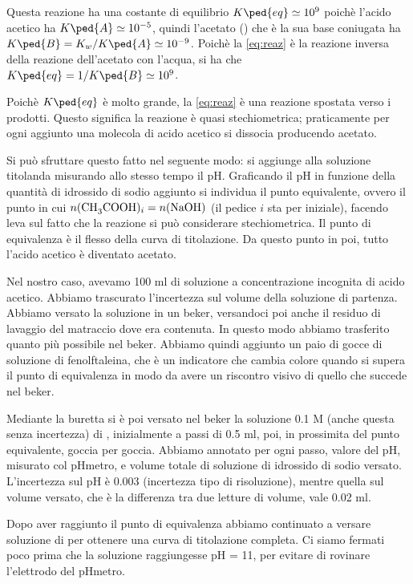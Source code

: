 Questa reazione ha una costante di equilibrio $K\ped{eq} \simeq 10^9$ poichè l'acido acetico ha $K\ped{A} \simeq 10^{-5}$,
quindi l'acetato () che è la sua base coniugata ha $K\ped{B} = K_w / K\ped{A} \simeq 10^{-9}$.
Poichè la \eqref{eq:reaz} è la reazione
inversa della reazione dell'acetato con l'acqua, si ha che $K\ped{eq} = 1/K\ped{B} \simeq 10^9$.

Poichè $K\ped{eq}$ è molto grande, la \eqref{eq:reaz} è una reazione spostata verso i prodotti. Questo significa la reazione
è quasi stechiometrica; praticamente per ogni  aggiunto una molecola di acido acetico si dissocia producendo acetato.

Si può sfruttare questo fatto nel seguente modo: si aggiunge  alla soluzione titolanda misurando allo
stesso tempo il pH. Graficando il pH in funzione della quantità di idrossido di sodio aggiunto si individua
il punto equivalente, ovvero il punto in cui $n(\ce{CH3COOH})_i = n(\ce{NaOH})$ (il pedice $i$ sta per iniziale),
facendo leva sul fatto che la reazione si può considerare stechiometrica. Il punto di equivalenza è
il flesso della curva di titolazione. Da questo punto in poi, tutto l'acido acetico è diventato acetato.

Nel nostro caso, avevamo 100 ml di soluzione a concentrazione incognita di acido acetico. Abbiamo
trascurato l'incertezza sul volume della soluzione di partenza. Abbiamo versato la soluzione in un
beker, versandoci poi anche il residuo di lavaggio del matraccio dove era contenuta. In questo modo abbiamo
trasferito quanto più  possibile nel beker. Abbiamo quindi aggiunto un paio di gocce
di soluzione di fenolftaleina, che è un indicatore che cambia colore quando si supera il punto di equivalenza
in modo da avere un riscontro visivo di quello che succede nel beker.

Mediante la buretta si è poi versato nel beker la soluzione 0.1 M (anche questa senza incertezza) di , inizialmente a
passi di 0.5 ml, poi, in prossimita del punto equivalente, goccia per goccia. Abbiamo annotato per ogni passo, valore
del pH, misurato col pHmetro, e volume totale di soluzione di idrossido di sodio versato. L'incertezza sul pH è 0.003
(incertezza tipo di risoluzione), mentre quella sul volume versato, che è la differenza tra due letture di volume,
vale 0.02 ml. 

Dopo aver raggiunto il punto di equivalenza abbiamo continuato a versare soluzione di  per
ottenere una curva di titolazione completa. Ci siamo fermati poco prima che la soluzione raggiungesse pH = 11,
per evitare di rovinare l'elettrodo del pHmetro.
